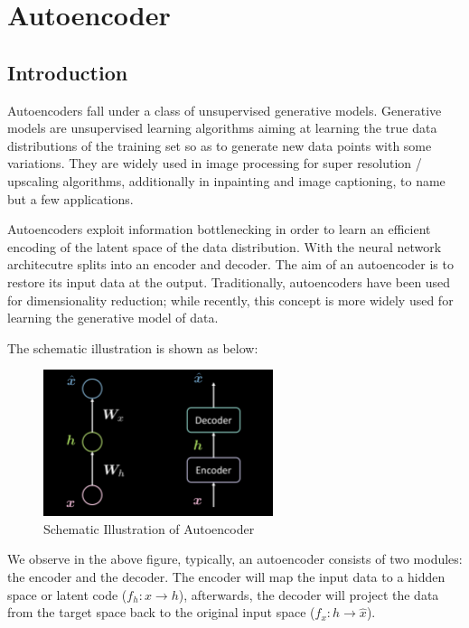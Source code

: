 \chapter{ Autoencoder }
\section{ Introduction }

Autoencoders fall under a class of unsupervised generative models. Generative models are unsupervised learning algorithms aiming at learning the true data distributions of the training set so as to generate new data points with some variations. They are widely used in image processing for super resolution / upscaling algorithms, additionally in inpainting and image captioning, to name but a few applications.

Autoencoders exploit information bottlenecking in order to learn an efficient encoding of the latent space of the data distribution. With the neural network architecutre splits into an encoder and decoder. The aim of an autoencoder is to restore its input data at the output. Traditionally, autoencoders have been used for dimensionality reduction; while recently, this concept is more widely used for learning the generative model of data.

The schematic illustration is shown as below:

\begin{figure}[htb]
    \centering
    \includegraphics[width=0.6\textwidth]{figs/Schematic_Illustration_of_Autoencoder.png}
    \caption{Schematic Illustration of Autoencoder}
    \label{fig:Schematic_Illustration_of_Autoencoder}
\end{figure}

We observe in the above figure, typically, an autoencoder consists of two modules: the encoder and the decoder. The encoder will map the input data to a hidden space or latent code ($f_h: x\rightarrow h$), afterwards, the decoder will project the data from the target space back to the original input space ($f_x: h\rightarrow \hat{x}$).

